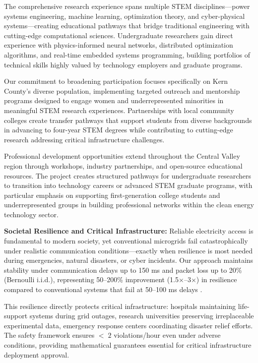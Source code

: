 \documentclass[12pt]{article}
\begin{document}
The comprehensive research experience spans multiple STEM disciplines---power systems engineering, machine learning, optimization theory, and cyber-physical systems---creating educational pathways that bridge traditional engineering with cutting-edge computational sciences. Undergraduate researchers gain direct experience with physics-informed neural networks, distributed optimization algorithms, and real-time embedded systems programming, building portfolios of technical skills highly valued by technology employers and graduate programs.

Our commitment to broadening participation focuses specifically on Kern County's diverse population, implementing targeted outreach and mentorship programs designed to engage women and underrepresented minorities in meaningful STEM research experiences. Partnerships with local community colleges create transfer pathways that support students from diverse backgrounds in advancing to four-year STEM degrees while contributing to cutting-edge research addressing critical infrastructure challenges.

Professional development opportunities extend throughout the Central Valley region through workshops, industry partnerships, and open-source educational resources. The project creates structured pathways for undergraduate researchers to transition into technology careers or advanced STEM graduate programs, with particular emphasis on supporting first-generation college students and underrepresented groups in building professional networks within the clean energy technology sector.

\textbf{Societal Resilience and Critical Infrastructure:} Reliable electricity access is fundamental to modern society, yet conventional microgrids fail catastrophically under realistic communication conditions---exactly when resilience is most needed during emergencies, natural disasters, or cyber incidents. Our approach maintains stability under communication delays up to 150 ms and packet loss up to 20\% (Bernoulli i.i.d.), representing 50--200\% improvement (1.5×--3×) in resilience compared to conventional systems that fail at 50--100 ms delays \cite{baseline2023delay}.

This resilience directly protects critical infrastructure: hospitals maintaining life-support systems during grid outages, research universities preserving irreplaceable experimental data, emergency response centers coordinating disaster relief efforts. The safety framework ensures $<\;2$ violations/hour even under adverse conditions, providing mathematical guarantees essential for critical infrastructure deployment approval.
\end{document}
